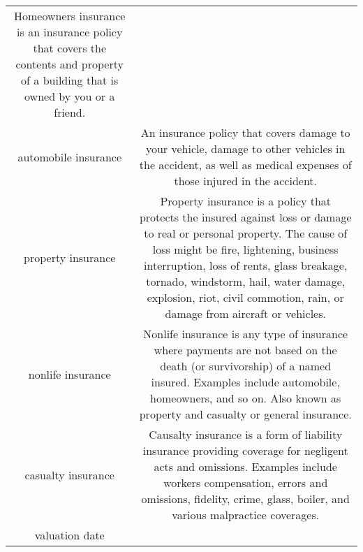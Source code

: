 \documentclass[
]{book}
\begin{document}
\begin{longtable}[]{@{}cc@{}}
\begin{minipage}[t]{0.43\columnwidth}
Homeowners insurance is an
insurance policy that covers
the contents and property of a
building that is owned by you
or a friend.\strut
\end{minipage}\tabularnewline
\begin{minipage}[t]{0.39\columnwidth}\centering
automobile insurance\strut
\end{minipage} & \begin{minipage}[t]{0.43\columnwidth}\centering
An insurance policy that
covers damage to your vehicle,
damage to other vehicles in
the accident, as well as
medical expenses of those
injured in the accident.\strut
\end{minipage}\tabularnewline
\begin{minipage}[t]{0.39\columnwidth}\centering
property insurance\strut
\end{minipage} & \begin{minipage}[t]{0.43\columnwidth}\centering
Property insurance is a policy
that protects the insured
against loss or damage to real
or personal property. The
cause of loss might be fire,
lightening, business
interruption, loss of rents,
glass breakage, tornado,
windstorm, hail, water damage,
explosion, riot, civil
commotion, rain, or damage
from aircraft or vehicles.\strut
\end{minipage}\tabularnewline
\begin{minipage}[t]{0.39\columnwidth}\centering
nonlife insurance\strut
\end{minipage} & \begin{minipage}[t]{0.43\columnwidth}\centering
Nonlife insurance is any type
of insurance where payments
are not based on the death (or
survivorship) of a named
insured. Examples include
automobile, homeowners, and so
on. Also known as property and
casualty or general insurance.\strut
\end{minipage}\tabularnewline
\begin{minipage}[t]{0.39\columnwidth}\centering
casualty insurance\strut
\end{minipage} & \begin{minipage}[t]{0.43\columnwidth}\centering
Causalty insurance is a form
of liability insurance
providing coverage for
negligent acts and omissions.
Examples include workers
compensation, errors and
omissions, fidelity, crime,
glass, boiler, and various
malpractice coverages.\strut
\end{minipage}\tabularnewline
\begin{minipage}[t]{0.39\columnwidth}\centering
valuation date\strut

\end{minipage}
\end{longtable}
\end{document}
